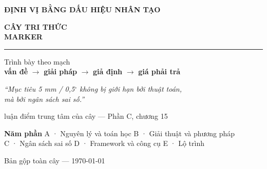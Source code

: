 \documentclass[11pt,a4paper,oneside]{report}
\begin{document}
\begin{titlepage}
\thispagestyle{empty}

\vspace*{4.2cm}
\begin{flushleft}
{\sffamily\bfseries\color{accent}\large ĐỊNH VỊ BẰNG DẤU HIỆU NHÂN TẠO\par}
\vspace{0.5cm}
{\sffamily\bfseries\color{inkblue}\fontsize{40}{45}\selectfont
CÂY TRI THỨC\\[0.12em] MARKER\par}
\vspace{0.9cm}
{\color{accent}\rule{7cm}{2.4pt}}\par
\vspace{0.9cm}
{\large\color{inkblue!85}
Trình bày theo mạch\\[0.25em]
\textbf{vấn đề} \(\rightarrow\) \textbf{giải pháp} \(\rightarrow\) \textbf{giả định} \(\rightarrow\) \textbf{giá phải trả}\par}
\end{flushleft}

\vfill
\begin{flushleft}
{\itshape\color{tiercol}``Mục tiêu 5 mm / 0,5\(^\circ\) không bị giới hạn bởi thuật toán,\\
mà bởi ngân sách sai số.''\par}
{\footnotesize\sffamily\color{tiercol}luận điểm trung tâm của cây --- Phần C, chương 15\par}
\vspace{1.1cm}
{\footnotesize\sffamily\color{inkblue}\textbf{Năm phần}\quad
A · Nguyên lý và toán học \quad B · Giải thuật và phương pháp\\[0.25em]
\quad C · Ngân sách sai số \quad D · Framework và công cụ \quad E · Lộ trình\par}
\vspace{0.5em}
{\footnotesize\sffamily\color{tiercol}Bản gộp toàn cây --- \today\par}
\end{flushleft}
\end{titlepage}


\cleardoublepage
\tableofcontents
\cleardoublepage
{}









\printbibliography[title={Nguồn}]
\end{document}
